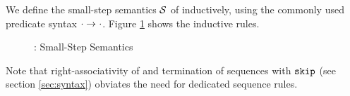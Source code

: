 
We define the small-step semantics $\mathcal{S}$ of \svlidf inductively, using the commonly used predicate syntax ${\cdot} \rightarrow^{} {\cdot}$.
Figure \ref{fig:svl-sem-dyn-sstep} shows the inductive rules.
\begin{figure}
    \boxed{\sstep{\pi}{\pi}}
    
    \caption{\svlidf: Small-Step Semantics}
    \label{fig:svl-sem-dyn-sstep}
\end{figure}
Note that right-associativity of \ttt{;} and termination of sequences with $\textup{\texttt{skip}}$ (see section \ref{sec:syntax}) obviates the need for dedicated sequence rules.
